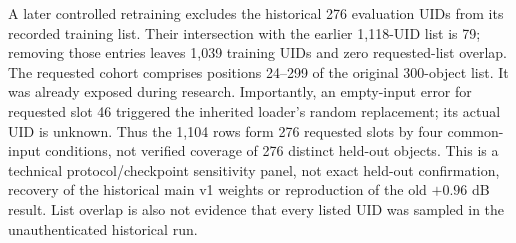 \documentclass[times,twocolumn,final]{elsarticle}
\providecommand{\DIFadd}[1]{{\protect\color{blue} \sf #1}} %
\providecommand{\DIFaddbegin}{} %
\providecommand{\DIFaddend}{} %
\providecommand{\DIFdelbegin}{} %
\providecommand{\DIFdelend}{} %
\begin{document}
\DIFdelbegin %
\DIFdelend \DIFaddbegin \DIFadd{A later controlled retraining excludes the historical 276 evaluation UIDs from its recorded training list. Their intersection with the earlier 1,118-UID list is 79; removing those entries leaves 1,039 training UIDs and zero requested-list overlap. The requested cohort comprises positions 24--299 of the original 300-object list. It was already exposed during research. Importantly, an empty-input error for requested slot 46 triggered the inherited loader's random replacement; its actual UID is unknown. Thus the 1,104 rows form 276 requested slots by four common-input conditions, not verified coverage of 276 distinct held-out objects. This is a technical protocol/checkpoint sensitivity panel, not exact held-out confirmation, recovery of the historical main v1 weights or reproduction of the old $+0.96$ dB result. List overlap is also not evidence that every listed UID was sampled in the unauthenticated historical run.
}\DIFaddend 
\end{document}
